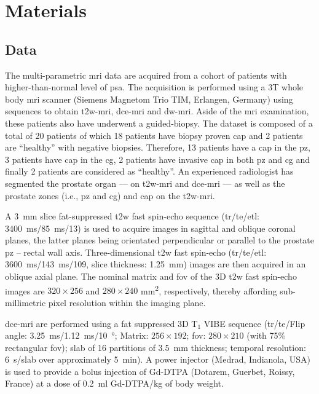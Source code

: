 \section{Materials}\label{sec:materials}

\subsection{Data}\label{sec:data}

The multi-parametric \ac{mri} data are acquired from a cohort of patients with higher-than-normal level of \ac{psa}.
The acquisition is performed using a 3T whole body \ac{mri} scanner (Siemens Magnetom Trio TIM, Erlangen, Germany) using sequences to obtain \ac{t2w}-\ac{mri}, \ac{dce}-\ac{mri} and \ac{dw}-\ac{mri}.
Aside of the \ac{mri} examination, these patients also have underwent a guided-biopsy.
The dataset is composed of a total of 20 patients of which 18 patients have biopsy proven \ac{cap} and 2 patients are ``healthy'' with negative biopsies.
Therefore, 13 patients have a \ac{cap} in the \ac{pz}, 3 patients have \ac{cap} in the \ac{cg}, 2 patients have invasive \ac{cap} in both \ac{pz} and \ac{cg} and finally 2 patients are considered as ``healthy''.
An experienced radiologist has segmented the prostate organ --- on \ac{t2w}-\ac{mri} and \ac{dce}-\ac{mri} --- as well as the prostate zones (i.e., \ac{pz} and \ac{cg}) and \ac{cap} on the \ac{t2w}-\ac{mri}.

A \SI{3}{\mm} slice fat-suppressed \ac{t2w} fast spin-echo sequence (\ac{tr}/\ac{te}/\ac{etl}: \SI{3400}{\ms}/\SI{85}{\ms}/13) is used to acquire images in sagittal and oblique coronal planes, the latter planes being orientated perpendicular or parallel to the prostate \ac{pz} – rectal wall axis.
Three-dimensional \ac{t2w} fast spin-echo (\ac{tr}/\ac{te}/\ac{etl}: \SI{3600}{\ms}/\SI{143}{\ms}/109, slice thickness: \SI{1.25}{\mm}) images are then acquired in an oblique axial plane.
The nominal matrix and \ac{fov} of the 3D \ac{t2w} fast spin-echo images are $320 \times 256$ and $280 \times 240$ mm\textsuperscript{2}, respectively, thereby affording sub-millimetric pixel resolution within the imaging plane.

\ac{dce}-\ac{mri} are performed using a fat suppressed 3D T$_1$ VIBE sequence (\ac{tr}/\ac{te}/Flip angle: \SI{3.25}{\ms}/\SI{1.12}{\ms}/\SI{10}{\degree}; Matrix: $256 \times 192$; \ac{fov}: $280 \times 210$ (with 75\% rectangular \ac{fov}); slab of 16 partitions of \SI{3.5}{\mm} thickness; temporal resolution: \SI{6}{\s}/slab over approximately \SI{5}{\minute}).
A power injector (Medrad, Indianola, USA) is used to provide a bolus injection of Gd-DTPA (Dotarem, Guerbet, Roissy, France) at a dose of \SI{0.2}{\ml} Gd-DTPA/kg of body weight.

